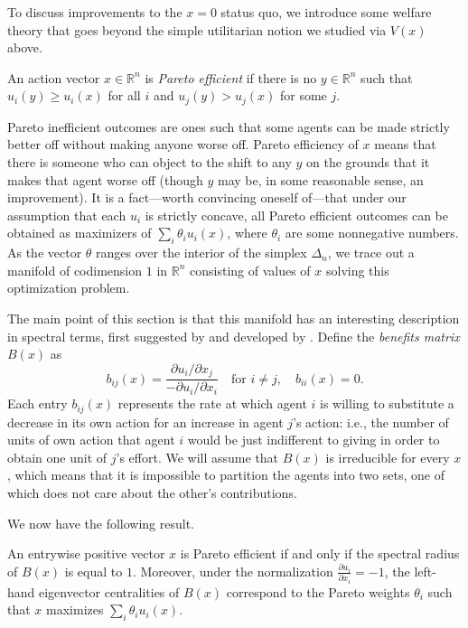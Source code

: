 \documentclass{notices}
\theoremstyle{definition}\newtheorem{problem}{Problem}
\begin{document}
To discuss improvements to the $x=0$ status quo, we introduce some welfare theory that goes beyond the simple utilitarian notion we studied via $V(x)$ above.

\begin{definition}
An action vector $x \in \mathbb{R}^n$ is \emph{Pareto efficient} if there is no $y \in \mathbb{R}^n$ such that $u_i(y) \geq u_i(x)$ for all $i$ and $u_j(y) > u_j(x)$ for some $j$. 
\end{definition}

Pareto inefficient outcomes are ones such that some agents can be made strictly better off without making anyone worse off. Pareto efficiency of $x$ means that there is someone who can object to the shift to any $y$ on the grounds that it makes that agent worse off (though $y$ may be, in some reasonable sense, an improvement).
It is a fact---worth convincing oneself of---that under our assumption that each $u_i$ is strictly concave, all Pareto efficient outcomes can be obtained as maximizers of $\sum_i \theta_i u_i(x)$, where $\theta_i$ are some nonnegative numbers. As the vector $\theta$ ranges over the interior of the simplex $\Delta_n$, we trace out a manifold of codimension $1$ in $ \mathbb{R}^n$ consisting of values of $x$ solving this optimization problem.


The main point of this section is that this manifold has an interesting description in spectral terms, first suggested by \cite{ghosh2008charity} and developed by \cite{elliott2019network}. Define the \emph{benefits matrix} $B(x)$ as
$$
b_{ij}(x) = \frac{{\partial u_i}/{\partial x_j}}{-{\partial u_i}/{\partial x_i}} \quad \text{for } i \neq j, \quad b_{ii}(x) = 0.
$$
Each entry $b_{ij}(x)$ represents the rate at which agent $i$ is willing to substitute a decrease in its own action for an increase in agent $j$'s action: i.e., the number of units of own action that agent $i$ would be just indifferent to giving in order to obtain one unit of $j$'s effort. We will assume that $B(x)$ is irreducible for every $x$, which means that it is impossible to partition the agents into two sets, one of which does not care about the other's contributions.

We now have the following result.
\begin{prop}\label{prop:pareto}
An entrywise positive vector $x$ is Pareto efficient if and only if the spectral radius of $B(x)$ is equal to $1$. Moreover, under the normalization $\frac{\partial u_i}{\partial x_i} = -1$, the left-hand eigenvector centralities of $B(x)$ correspond to the {Pareto weights} $\theta_i$ such that $x$ maximizes $\sum_{i} \theta_i u_i(x)$.
\end{prop}
\end{document}
